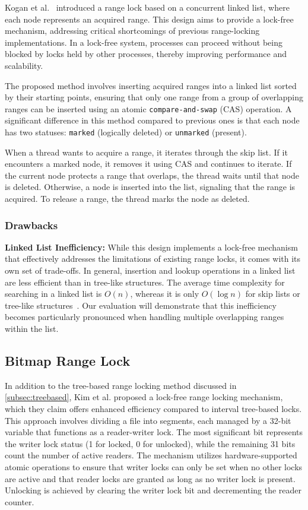 Kogan et al.~\parencite{kogan2020scalable} introduced a range lock based on a concurrent linked list, where each node represents an acquired range. This design aims to provide a lock-free mechanism, addressing critical shortcomings of previous range-locking implementations. In a lock-free system, processes can proceed without being blocked by locks held by other processes, thereby improving performance and scalability.

The proposed method involves inserting acquired ranges into a linked list sorted by their starting points, ensuring that only one range from a group of overlapping ranges can be inserted using an atomic \texttt{compare-and-swap} (CAS) operation. A significant difference in this method compared to previous ones is that each node has two statuses: \texttt{marked} (logically deleted) or \texttt{unmarked} (present).

When a thread wants to acquire a range, it iterates through the skip list. If it encounters a marked node, it removes it using CAS and continues to iterate. If the current node protects a range that overlaps, the thread waits until that node is deleted. Otherwise, a node is inserted into the list, signaling that the range is acquired. To release a range, the thread marks the node as deleted.

\subsubsection*{Drawbacks}

\textbf{Linked List Inefficiency:} While this design implements a lock-free mechanism that effectively addresses the limitations of existing range locks, it comes with its own set of trade-offs. In general, insertion and lookup operations in a linked list are less efficient than in tree-like structures. The average time complexity for searching in a linked list is \( O(n) \), whereas it is only \( O(\log n) \) for skip lists or tree-like structures~\parencite{fomitchev2004lock}. Our evaluation will demonstrate that this inefficiency becomes particularly pronounced when handling multiple overlapping ranges within the list.

\subsection{Bitmap Range Lock}

In addition to the tree-based range locking method discussed in \ref{subsec:treebased}, Kim et al. proposed a lock-free range locking mechanism, which they claim offers enhanced efficiency compared to interval tree-based locks. 
This approach involves dividing a file into segments, each managed by a 32-bit variable that functions as a reader-writer lock. The most significant bit represents the writer lock status (1 for locked, 0 for unlocked), while the remaining 31 bits count the number of active readers. 
The mechanism utilizes hardware-supported atomic operations to ensure that writer locks can only be set when no other locks are active and that reader locks are granted as long as no writer lock is present. 
Unlocking is achieved by clearing the writer lock bit and decrementing the reader counter. 

